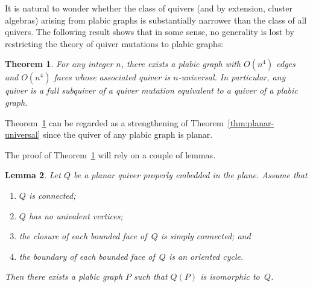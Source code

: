 \documentclass[10pt]{amsart}
\newtheorem{theorem}{Theorem}[section]
\newtheorem{lemma}[theorem]{Lemma}
\theoremstyle{definition}
\newcommand{\ie}{i.e.}
\begin{document}
It is natural to wonder whether the class of quivers (and by extension, cluster algebras)
arising from plabic graphs is substantially narrower than the class of all quivers. 
The following result shows that in some sense, no generality is lost 
by restricting the theory of quiver mutations to plabic graphs:

\begin{theorem}
\label{th:plabic-universal}
For any integer $n$, there exists a plabic graph with $O(n^4)$ edges and $O(n^4)$ faces 
whose associated quiver is $n$-universal. 
In particular, any quiver is a full subquiver of a quiver
mutation equivalent to a quiver of a plabic graph. 
\end{theorem}

Theorem~\ref{th:plabic-universal}
can be regarded as a strengthening of Theorem~\ref{thm:planar-universal} 
since the quiver of any plabic graph is planar.

The proof of Theorem~\ref{th:plabic-universal} will rely on a couple of lemmas.

\goodbreak
\begin{lemma}
\label{lem:quivers-from-plabic}
Let $Q$ be a planar quiver properly embedded in the plane. 
Assume that 
\begin{enumerate}[label=(\alph*)]
\item\label{lemma3.7_a} %
$Q$ is connected; 
\item\label{lemma3.7_b} %
$Q$ has no univalent vertices; 
\item\label{lemma3.7_c} %
the closure of each bounded face of~$Q$ is simply connected; and 
\item\label{lemma3.7_d} %
the boundary of each bounded face of~$Q$ is an oriented cycle.
\end{enumerate}
Then %
there exists a plabic graph $P$ such that $Q(P)$ is isomorphic to~$Q$. 
\end{lemma}
\end{document}
